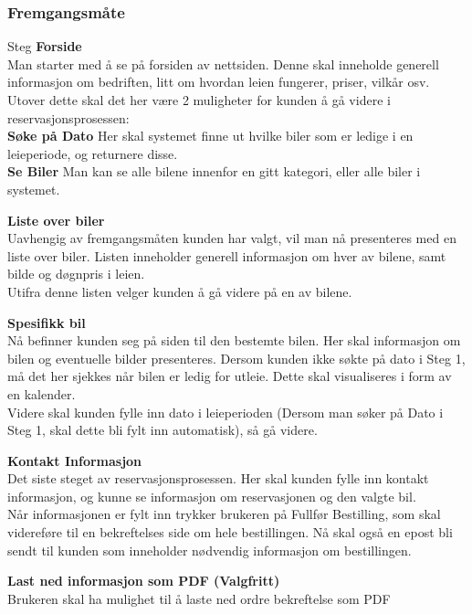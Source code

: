 \subsubsection{Fremgangsmåte}
\begin{steps}{Steg}
\step \textbf{Forside}\\Man starter med å se på forsiden av nettsiden. Denne skal inneholde generell informasjon om bedriften, litt om hvordan leien fungerer, priser, vilkår osv. Utover dette skal det her være 2 muligheter for kunden å gå videre i reservasjonsprosessen:\\
\textbf{Søke på Dato} Her skal systemet finne ut hvilke biler som er ledige i en leieperiode, og returnere disse. \\
\textbf{Se Biler} Man kan se alle bilene innenfor en gitt kategori, eller alle biler i systemet.

\step \textbf{Liste over biler}\\Uavhengig av fremgangsmåten kunden har valgt, vil man nå presenteres med en liste over biler. Listen inneholder generell informasjon om hver av bilene, samt bilde og døgnpris i leien.\\
Utifra denne listen velger kunden å gå videre på en av bilene.

\step \textbf{Spesifikk bil}\\Nå befinner kunden seg på siden til den bestemte bilen. Her skal informasjon om bilen og eventuelle bilder presenteres.
Dersom kunden ikke søkte på dato i Steg 1, må det her sjekkes når bilen er ledig for utleie. Dette skal visualiseres i form av en kalender.\\
Videre skal kunden fylle inn dato i leieperioden (Dersom man søker på Dato i Steg 1, skal dette bli fylt inn automatisk), så gå videre.

\step \textbf{Kontakt Informasjon}\\Det siste steget av reservasjonsprosessen. Her skal kunden fylle inn kontakt informasjon, og kunne se informasjon om reservasjonen og den valgte bil.\\
Når informasjonen er fylt inn trykker brukeren på Fullfør Bestilling, som skal videreføre til en bekreftelses side om hele bestillingen. Nå skal også en epost bli sendt til kunden som inneholder nødvendig informasjon om bestillingen.

\step \textbf{Last ned informasjon som PDF (Valgfritt)}\\Brukeren skal ha mulighet til å laste ned ordre bekreftelse som PDF 

\end{steps}
